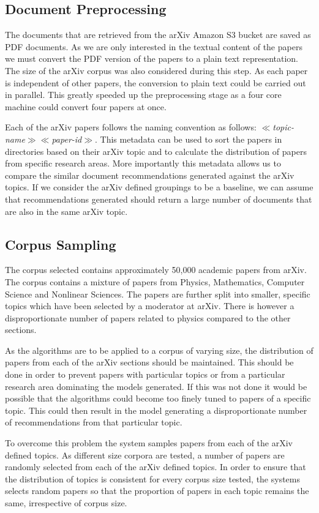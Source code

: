 \subsection{Document Preprocessing}
The documents that are retrieved from the arXiv Amazon S3 bucket are saved as PDF documents.
As we are only interested in the textual content of the papers we must convert the PDF version of the papers to a plain text representation.
The size of the arXiv corpus was also considered during this step.
As each paper is independent of other papers, the conversion to plain text could be carried out in parallel.
This greatly speeded up the preprocessing stage as a four core machine could convert four papers at once.

Each of the arXiv papers follows the naming convention as follows: \textit{$\ll$topic-name$\gg\ll$paper-id$\gg$}.
This metadata can be used to sort the papers in directories based on their arXiv topic and to calculate the distribution of papers from specific research areas.
More importantly this metadata allows us to compare the similar document recommendations generated against the arXiv topics.
If we consider the arXiv defined groupings to be a baseline, we can assume that recommendations generated should return a large number of documents that are also in the same arXiv topic.

\subsection{Corpus Sampling}
The corpus selected contains approximately 50,000 academic papers from arXiv.
The corpus contains a mixture of papers from Physics, Mathematics, Computer Science and Nonlinear Sciences.
The papers are further split into smaller, specific topics which have been selected by a moderator at arXiv.
There is however a disproportionate number of papers related to physics compared to the other sections.

As the algorithms are to be applied to a corpus of varying size, the distribution of papers from each of the arXiv sections should be maintained.
This should be done in order to prevent papers with particular topics or from a particular research area dominating the models generated.
If this was not done it would be possible that the algorithms could become too finely tuned to papers of a specific topic.
This could then result in the model generating a disproportionate number of recommendations from that particular topic.

To overcome this problem the system samples papers from each of the arXiv defined topics.
As different size corpora are tested, a number of papers are randomly selected from each of the arXiv defined topics.
In order to ensure that the distribution of topics is consistent for every corpus size tested, the systems selects random papers so that the proportion of papers in each topic remains the same, irrespective of corpus size.

